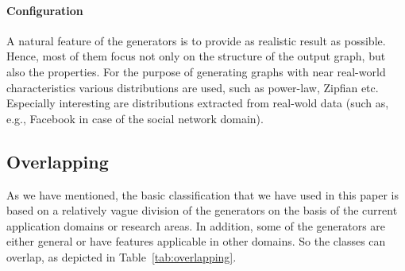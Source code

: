 \paragraph{Configuration}
A natural feature of the generators is to provide as realistic result as possible. Hence, most of them focus not only on the structure of the output graph, but also the properties. For the purpose of generating graphs with near real-world characteristics various distributions are used, such as power-law, Zipfian etc. Especially interesting are distributions extracted from real-wold data (such as, e.g., Facebook in case of the social network domain).

\subsection{Overlapping}
\label{sec:overlapping}

As we have mentioned, the basic classification that we have used in this paper
is  based on a relatively vague division of the generators on the basis of the
current application domains or research areas. In addition, some of the
generators are either general or have features applicable in other domains. So
the classes can overlap, as depicted in Table~\ref{tab:overlapping}.

